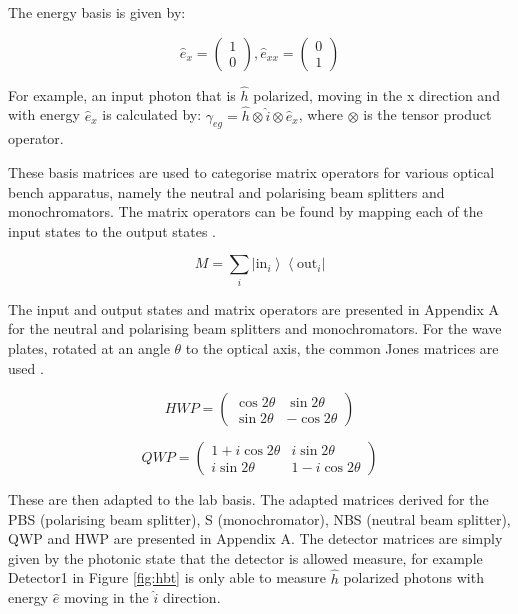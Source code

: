 \documentclass[12pt, twoside]{article}
\numberwithin{equation}{section}
\begin{document}
The energy basis is given by:

\begin{equation}
\hat{e}_x = \begin{pmatrix}1\\0\end{pmatrix}, \hat{e}_{xx} = \begin{pmatrix}0\\1\end{pmatrix}
\end{equation}

For example, an input photon that is $\hat{h}$ polarized, moving in the
x direction and with energy $\hat{e}_x$ is calculated by:
$\gamma_{eg} = \hat{h} \otimes \hat{i} \otimes \hat{e}_x$, where
$\otimes$ is the tensor product operator.

These basis matrices are used to categorise matrix operators for various
optical bench apparatus, namely the neutral and polarising beam
splitters and monochromators. The matrix operators can be found by
mapping each of the input states to the output states \cite{bible}.

\begin{equation}
M = \sum_{i} \left| \text{in}_i \right\rangle \left\langle \text{out}_i\right| 
\end{equation}

The input and output states and matrix operators are presented in
Appendix A for the neutral and polarising beam splitters and
monochromators. For the wave plates, rotated at an angle $\theta$ to the
optical axis, the common Jones matrices are used \cite{jones2}.

\begin{equation}
HWP = \begin{pmatrix} \cos{2 \theta} & \sin{2 \theta} \\ \sin{2 \theta} & -\cos{2 \theta} \end{pmatrix}
\end{equation}

\begin{equation}
QWP = \begin{pmatrix} 1 + i \cos{2 \theta} & i \sin{2 \theta} \\ i \sin{2 \theta} & 1- i \cos{2 \theta} \end{pmatrix}
\end{equation}

These are then adapted to the lab basis. The adapted matrices derived
for the PBS (polarising beam splitter), S (monochromator), NBS (neutral
beam splitter), QWP and HWP are presented in Appendix A. The detector
matrices are simply given by the photonic state that the detector is
allowed measure, for example Detector1 in Figure \ref{fig:hbt} is only
able to measure $\hat{h}$ polarized photons with energy $\hat{e}$ moving
in the $\hat{i}$ direction.
\end{document}
